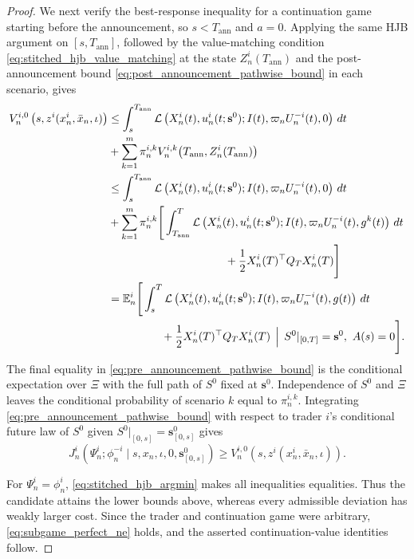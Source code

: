 \documentclass[12pt]{article}
\numberwithin{equation}{section}
\theoremstyle{definition}
\begin{document}
\begin{proof}
We next verify the best-response inequality for a continuation game starting
before the announcement, so \(s<T_{\mathrm{ann}}\) and \(a=0\). Applying the
same HJB argument on \([s,T_{\mathrm{ann}}]\), followed by
the value-matching condition \eqref{eq:stitched_hjb_value_matching} at the
state \(Z_n^i(T_{\mathrm{ann}})\) and
the post-announcement bound \eqref{eq:post_announcement_pathwise_bound} in each
scenario, gives
\begin{equation}\label{eq:pre_announcement_pathwise_bound}
\begin{aligned}
V_n^{i,0}\left(s,z^i(x_n^i,\bar x_n,\iota)\right)
&\leq
\int_s^{T_{\mathrm{ann}}}
\mathcal L\left(
X_n^i(t),u_n^i(t;\mathbf{s}^0);
I(t),\varpi_nU_n^{-i}(t),0
\right)\,dt
\\
&+
\sum_{k=1}^m\pi_n^{i,k}
V_n^{i,k}\bigl(
T_{\mathrm{ann}},Z_n^i(T_{\mathrm{ann}})
\bigr)\\
&\leq
\int_s^{T_{\mathrm{ann}}}
\mathcal L\left(
X_n^i(t),u_n^i(t;\mathbf{s}^0);
I(t),\varpi_nU_n^{-i}(t),0
\right)\,dt
\\
&+
\sum_{k=1}^m\pi_n^{i,k}
\Bigg[
\int_{T_{\mathrm{ann}}}^T
\mathcal L\left(
X_n^i(t),u_n^i(t;\mathbf{s}^0);
I(t),\varpi_nU_n^{-i}(t),g^k(t)
\right)\,dt
\\
&\hspace{105pt}
+\frac{1}{2}X_n^i(T)^\top Q_TX_n^i(T)
\Bigg]
\\
&=
\mathbb E_n^i\Bigg[
\int_s^T
\mathcal L\left(
X_n^i(t),u_n^i(t;\mathbf{s}^0);
I(t),\varpi_nU_n^{-i}(t),g(t)
\right)\,dt
\\
&\hspace{48pt}
+\frac{1}{2}X_n^i(T)^\top Q_TX_n^i(T)
\,\Bigm|\,
S^0|_{[0,T]}=\mathbf{s}^0,\ A(s)=0
\Bigg].
\end{aligned}
\end{equation}
The final equality in \eqref{eq:pre_announcement_pathwise_bound} is the
conditional expectation over \(\Xi\) with the full path of \(S^0\) fixed at
\(\mathbf{s}^0\). Independence of \(S^0\) and \(\Xi\) leaves the conditional probability of
scenario \(k\) equal to \(\pi_n^{i,k}\). Integrating
\eqref{eq:pre_announcement_pathwise_bound} with respect to trader \(i\)'s
conditional future law of \(S^0\) given
\(S^0|_{[0,s]}=\mathbf{s}^0_{[0,s]}\) gives
\[
J_n^i\left(
\Psi_n^i;\phi_n^{-i}
\mid s,x_n,\iota,0,\mathbf{s}^0_{[0,s]}
\right)
\geq
V_n^{i,0}\left(s,z^i(x_n^i,\bar x_n,\iota)\right).
\]

For \(\Psi_n^i=\phi_n^i\), \eqref{eq:stitched_hjb_argmin} makes all inequalities
equalities. Thus the candidate attains the lower bounds above, whereas every
admissible deviation has weakly larger cost. Since the trader and
continuation game were arbitrary, \eqref{eq:subgame_perfect_ne} holds, and the
asserted continuation-value identities follow.
\end{proof}
\end{document}
